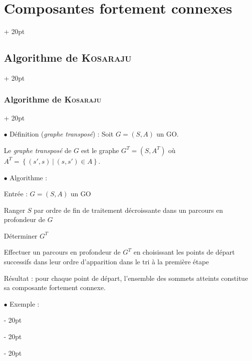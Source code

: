 \documentclass[a4paper, 12pt, twoside]{article}
\newcommand{\set}[1]{\left\{ #1 \right\}}
\newcommand{\ind}[1][20pt]{\advance\leftskip + #1}
\newcommand{\deind}[1][20pt]{\advance\leftskip - #1}
\newenvironment{indt}[2][20pt]{#2 \par \ind[#1]}{\par \deind} %
\begin{document}
\begin{indt}{\section{Composantes fortement connexes}}
\begin{indt}{\subsection{Algorithme de \textsc{Kosaraju}}}
\begin{indt}{\subsubsection{Algorithme de \textsc{Kosaraju}}}
                \vspace{12pt}
                
                $\bullet$ Définition (\textit{graphe transposé}) :
                Soit $G = (S, A)$ un GO.

                Le \textit{graphe transposé} de $G$ est le graphe $G^T = (S, A^T)$
                où $A^T = \set{(s', s)\ |\ (s, s') \in A}$.

                \vspace{12pt}
                
                $\bullet$ Algorithme :

                Entrée : $G = (S, A)$ un GO

                \begin{pseudocode}
                    Ranger $S$ par ordre de fin de traitement décroissante dans un parcours en profondeur de $G$

                    Déterminer $G^T$

                    Effectuer un parcours en profondeur de $G^T$ en choisissant les points de départ successifs dans leur ordre d'apparition dans le tri à la première étape
                \end{pseudocode}

                Résultat : pour chaque point de départ, l'ensemble des sommets atteints constitue sa composante fortement connexe.

                \vspace{12pt}
                
                $\bullet$ Exemple :
                \begin{center}
\end{center}
\end{indt}
\end{indt}
\end{indt}
\end{document}
